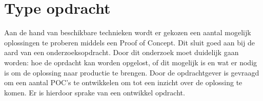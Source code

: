 \section{Type opdracht}

Aan de hand van beschikbare technieken wordt er gekozen een aantal mogelijk oplossingen te proberen middels een Proof of Concept. Dit sluit goed aan bij de aard van een onderzoeksopdracht. Door dit onderzoek moet duidelijk gaan worden: hoe de oprdacht kan worden opgelost, of dit mogelijk is en wat er nodig is om de oplossing naar productie te brengen. Door de opdrachtgever is gevraagd om een aantal POC's te ontwikkelen om tot een inzicht over de oplossing te komen. Er is hierdoor sprake van een ontwikkel opdracht.

